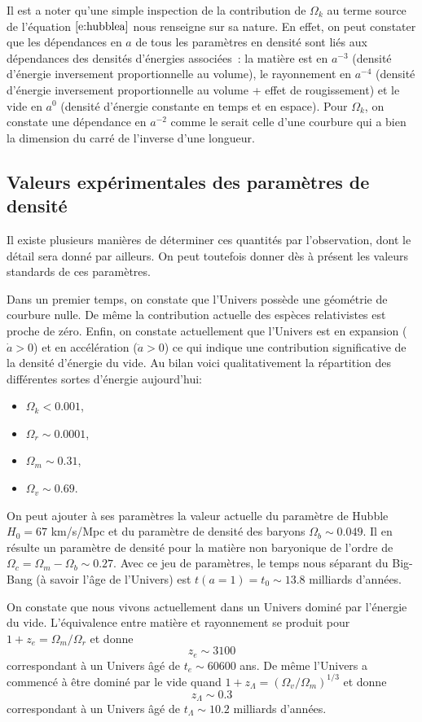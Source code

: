 Il est a noter qu'une simple inspection de la contribution de $\Omega_k$ au terme source de l'équation $\ref{e:hubblea}$ nous renseigne sur sa nature. En effet, on peut constater que les dépendances en $a$ de tous les paramètres en densité sont liés aux dépendances des densités d'énergies associées~: la matière est en $a^{-3}$ (densité d'énergie inversement proportionnelle au volume), le rayonnement en $a^{-4}$ (densité d'énergie inversement proportionnelle au volume + effet de rougissement) et le vide en $a^0$ (densité d'énergie constante en temps et en espace). Pour $\Omega_k$, on constate une dépendance en $a^{-2}$ comme le serait celle d'une courbure qui a bien la dimension du carré de l'inverse d'une longueur.

\subsection{Valeurs expérimentales des paramètres de densité}
Il existe plusieurs manières de déterminer ces quantités par l'observation, dont le détail sera donné par ailleurs. On peut toutefois donner dès à présent les valeurs standards de ces paramètres. 

Dans un premier temps, on constate que l'Univers possède une géométrie de courbure nulle. De même la contribution actuelle des espèces relativistes est proche de zéro. Enfin, on constate actuellement que l'Univers est en expansion ($\dot a>0$) et en accélération ($\ddot a>0$) ce qui indique une contribution significative de la densité d'énergie du vide. Au bilan voici qualitativement la répartition des différentes sortes d'énergie aujourd'hui:
\begin{itemize}
\item $\Omega_k<0.001$,
\item $\Omega_r\sim0.0001$,
\item $\Omega_m\sim 0.31$,
\item $\Omega_v\sim 0.69$.
\end{itemize}
On peut ajouter à ses paramètres la valeur actuelle du paramètre de Hubble $H_0=67$ km/s/Mpc et du paramètre de densité des baryons $\Omega_b\sim 0.049$.  Il en résulte un paramètre de densité pour la matière non baryonique de l'ordre de $\Omega_c=\Omega_m-\Omega_b\sim0.27$. Avec ce jeu de paramètres, le temps nous séparant du Big-Bang (à savoir l'âge de l'Univers) est $t(a=1)=t_0\sim13.8$ milliards d'années. 

On constate que nous vivons actuellement dans un Univers dominé par l'énergie du vide. L'équivalence entre matière et rayonnement se produit pour $1+z_e=\Omega_m/\Omega_r$ et donne 
\begin{equation}
z_e\sim 3100
\end{equation}
correspondant à un Univers âgé de $t_e\sim 60 600$ ans. De même l'Univers a commencé à être dominé par le vide quand $1+z_\Lambda=(\Omega_v/\Omega_m)^{1/3}$ et donne
\begin{equation}
z_\Lambda\sim 0.3
\end{equation}
correspondant à un Univers âgé de $t_\Lambda\sim 10.2$ milliards d'années. 

